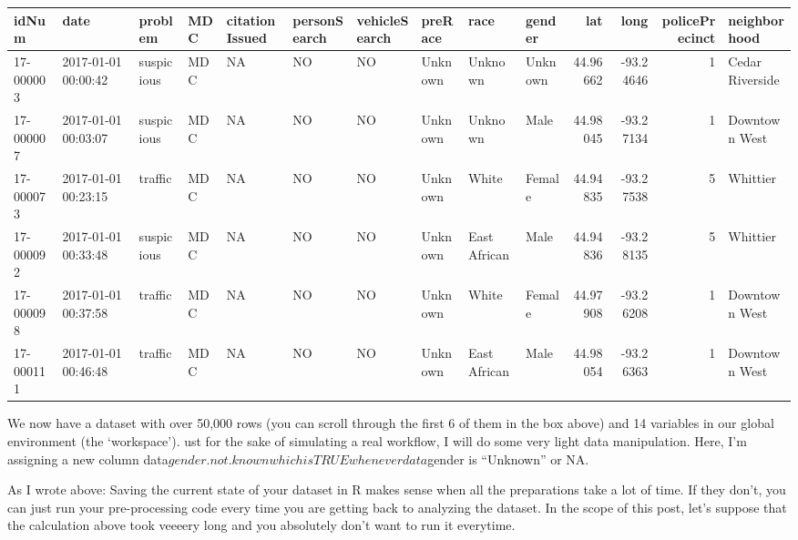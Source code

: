 \documentclass[
]{article}
\newenvironment{Shaded}{\begin{snugshade}}{\end{snugshade}}
\newcommand{\FunctionTok}[1]{\textcolor[rgb]{0.00,0.00,0.00}{#1}}
\newcommand{\NormalTok}[1]{#1}
\newcommand{\OtherTok}[1]{\textcolor[rgb]{0.56,0.35,0.01}{#1}}
\newcommand{\SpecialCharTok}[1]{\textcolor[rgb]{0.00,0.00,0.00}{#1}}
\newcommand{\StringTok}[1]{\textcolor[rgb]{0.31,0.60,0.02}{#1}}
\begin{document}
\begin{tabular}{l|l|l|l|l|l|l|l|l|l|r|r|r|l}
\hline
idNum & date & problem & MDC & citationIssued & personSearch & vehicleSearch & preRace & race & gender & lat & long & policePrecinct & neighborhood\\
\hline
17-000003 & 2017-01-01 00:00:42 & suspicious & MDC & NA & NO & NO & Unknown & Unknown & Unknown & 44.96662 & -93.24646 & 1 & Cedar Riverside\\
\hline
17-000007 & 2017-01-01 00:03:07 & suspicious & MDC & NA & NO & NO & Unknown & Unknown & Male & 44.98045 & -93.27134 & 1 & Downtown West\\
\hline
17-000073 & 2017-01-01 00:23:15 & traffic & MDC & NA & NO & NO & Unknown & White & Female & 44.94835 & -93.27538 & 5 & Whittier\\
\hline
17-000092 & 2017-01-01 00:33:48 & suspicious & MDC & NA & NO & NO & Unknown & East African & Male & 44.94836 & -93.28135 & 5 & Whittier\\
\hline
17-000098 & 2017-01-01 00:37:58 & traffic & MDC & NA & NO & NO & Unknown & White & Female & 44.97908 & -93.26208 & 1 & Downtown West\\
\hline
17-000111 & 2017-01-01 00:46:48 & traffic & MDC & NA & NO & NO & Unknown & East African & Male & 44.98054 & -93.26363 & 1 & Downtown West\\
\hline
\end{tabular}

We now have a dataset with over 50,000 rows (you can scroll through the
first 6 of them in the box above) and 14 variables in our global
environment (the `workspace'). ust for the sake of simulating a real
workflow, I will do some very light data manipulation. Here, I'm
assigning a new column
data\(gender.not.known which is TRUE whenever data\)gender is
``Unknown'' or NA.

\begin{Shaded}
\end{Shaded}

As I wrote above: Saving the current state of your dataset in R makes
sense when all the preparations take a lot of time. If they don't, you
can just run your pre-processing code every time you are getting back to
analyzing the dataset. In the scope of this post, let's suppose that the
calculation above took veeeery long and you absolutely don't want to run
it everytime.
\end{document}
